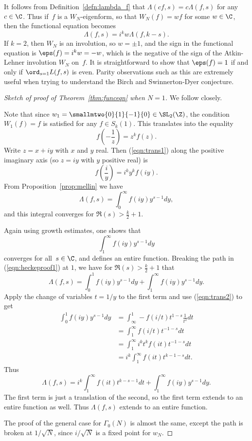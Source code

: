 \documentclass{report}
\begin{document}
It follows from Definition~\ref{defn:lambda_f} that $\Lambda(c f,
s)=c\Lambda(f,s)$ for any $c\in\C$.  Thus if~$f$ is a $W_N$-eigenform,
so that $W_N(f)=w f$ for some $w\in\C$, then the
functional equation becomes
$$
  \Lambda(f,s) = i^k w \Lambda(f,k-s).
$$
If $k=2$, then $W_N$ is an involution, so $w=\pm
1$, and the sign in the functional equation is $\eps(f) = i^k w = -w$,
which is the negative of the sign of the Atkin-Lehner involution $W_N$
on~$f$.  It is straightforward to show that $\eps(f) = 1$ if and only
if $\ord_{s=1} L(f,s)$ is even.  Parity observations such as
this are extremely useful when trying to understand the Birch and
Swinnerton-Dyer conjecture.


\begin{proof}[Sketch of proof of Theorem~\ref{thm:funceqn} when $N=1$]
We follow \cite[\S VIII.5]{knapp:elliptic} closely.

  Note that since $w_1=\smallmtwo{0}{1}{-1}{0}\in\SL_2(\Z)$, the condition $W_1(f)=f$ is
  satisfied for any $f\in S_k(1)$.  This translates into the equality
  \begin{equation}\label{eqn:trans1}
    f\left(-\frac{1}{z}\right) = z^k f(z).
  \end{equation}
  Write $z=x+iy$ with $x$ and $y$ real.  Then (\ref{eqn:trans1})
  along the positive imaginary axis (so $z=iy$ with $y$ positive real)
is
  \begin{equation}\label{eqn:trans2}
  f\left(\frac{i}{y}\right) =i^k y^k f(iy).
  \end{equation}
  From Proposition~\ref{prop:mellin} we have
  \begin{equation}\label{eqn:heckeproof1}
  \Lambda(f,s) = \int_{0}^{\infty} f(iy) y^{s-1} dy,
  \end{equation}
  and this integral converges for $\Re(s) >
  \frac{k}{2} + 1$.

  Again using growth estimates, one shows that
  $$
    \int_{1}^{\infty} f(iy)y^{s-1} dy
  $$
  converges for all~$s\in\C$, and defines an entire function.
 Breaking the path in (\ref{eqn:heckeproof1}) at $1$, we have
 for $\Re(s)>\frac{k}{2}+1$ that
  $$
 \Lambda(f,s) =
      \int_{0}^{1} f(iy) y^{s-1} dy +  \int_{1}^{\infty} f(iy) y^{s-1} dy.
  $$
Apply the change of variables $t=1/y$ to
the first term and use (\ref{eqn:trans2}) to get
\begin{align*}
\int_{0}^{1} f(iy) y^{s-1} dy &=
  \int_{\infty}^{1} -f(i/t)t^{1-s} \frac{1}{t^2} dt \\
 &= \int_{1}^{\infty} f(i/t)t^{-1-s} dt\\
 &= \int_{1}^{\infty} i^k t^k f(it)t^{-1-s} dt\\
 &= i^k \int_{1}^{\infty} f(it)t^{k-1-s} dt.
\end{align*}
Thus
  $$
 \Lambda(f,s) =
      i^k \int_{1}^{\infty} f(it)t^{k-s-1} dt
               +  \int_{1}^{\infty} f(iy) y^{s-1} dy.
  $$
The first term is just a translation of the second, so the first
term extends to an entire function as well.  Thus
$\Lambda(f,s)$ extends to an entire function.

The proof of the general case for $\Gamma_0(N)$ is almost the same,
except the path is broken at $1/\sqrt{N}$, since $i/\sqrt{N}$ is
a fixed point for $w_N$.
\end{proof}
\end{document}
